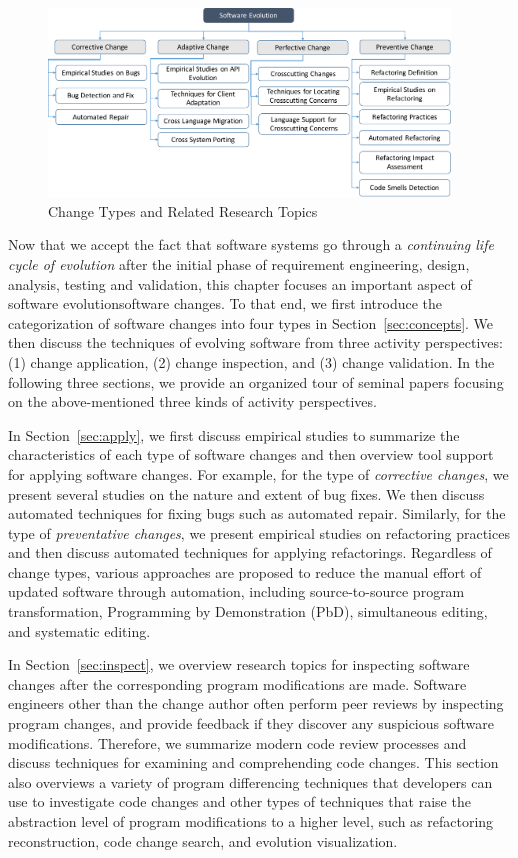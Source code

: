 \begin{figure}[ht]
 \centering
 \includegraphics[width=0.95\textwidth]{images/ChangeTypesTopics.pdf}
 \caption{Change Types and Related Research Topics} 
 \label{fig:changetypetopic}
\end{figure}

Now that we accept the fact that software systems go through a {\em continuing life cycle of evolution} after the initial phase of requirement engineering, design, analysis, testing and validation, this chapter focuses an important aspect of software evolution\textemdash software changes. To that end, we first introduce the categorization of software changes into four types in Section~\ref{sec:concepts}. We then discuss the techniques of evolving software from three activity perspectives: (1) change application, (2) change inspection, and (3) change validation. In the following three sections, we provide an organized tour of seminal papers focusing on the above-mentioned three kinds of activity perspectives. 

In Section~\ref{sec:apply}, we first discuss empirical studies to summarize the characteristics of each type of software changes and then overview tool support for applying software changes. For example, for the type of {\em corrective changes}, we present several studies on the nature and extent of bug fixes. We then discuss automated techniques for fixing bugs such as automated repair. Similarly, for the type of {\em preventative changes}, we present empirical studies on refactoring practices and then discuss automated techniques for applying refactorings.  Regardless of change types, various approaches are proposed to reduce the manual effort of updated software through automation, including source-to-source program transformation, Programming by Demonstration (PbD), simultaneous editing, and systematic editing.

In Section~\ref{sec:inspect}, we overview research topics for inspecting software changes after the corresponding program modifications are made. Software engineers other than the change author often perform peer reviews by inspecting program changes, and provide feedback if they discover any suspicious software modifications. Therefore, we summarize modern code review processes and discuss techniques for examining and comprehending code changes. This section also overviews a variety of program differencing techniques that developers can use to investigate code changes and other types of techniques that raise the abstraction level of program modifications to a higher level, such as refactoring reconstruction, code change search, and evolution visualization. 


